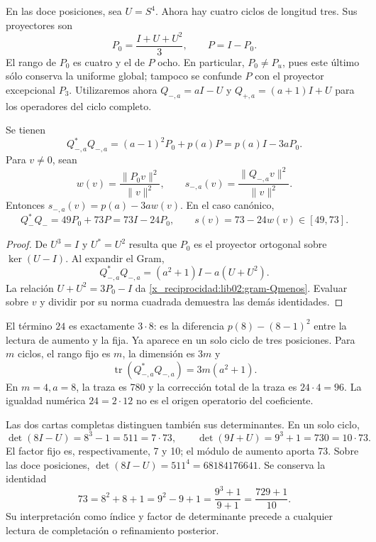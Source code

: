 En las doce posiciones, sea \(U=S^4\). Ahora hay cuatro ciclos de
longitud tres. Sus proyectores son
\[
 P_0=\frac{I+U+U^2}{3},\qquad P=I-P_0.
\]
El rango de \(P_0\) es cuatro y el de \(P\) ocho. En particular,
\(P_0\ne P_u\), pues este último sólo conserva la uniforme global;
tampoco se confunde \(P\) con el proyector excepcional \(P_3\).
Utilizaremos ahora \(Q_{-,a}=aI-U\) y \(Q_{+,a}=(a+1)I+U\)
para los operadores del ciclo completo.

\begin{theorem}
\label{x_reciprocidad:lib02:gram-ternario}
Se tienen
\begin{equation}
 Q_{-,a}^*Q_{-,a}
 =(a-1)^2P_0+p(a)P=p(a)I-3aP_0.
 \label{x_reciprocidad:lib02:gram-Qmenos}
\end{equation}
Para \(v\ne0\), sean
\[
 w(v)=\frac{\|P_0v\|^2}{\|v\|^2},\qquad
 s_{-,a}(v)=\frac{\|Q_{-,a}v\|^2}{\|v\|^2}.
\]
Entonces \(s_{-,a}(v)=p(a)-3aw(v)\). En el caso canónico,
\begin{equation}
 Q_-^*Q_-=49P_0+73P=73I-24P_0,
 \qquad s(v)=73-24w(v)\in[49,73].
 \label{x_reciprocidad:lib02:73-24w}
\end{equation}
\end{theorem}
\begin{proof}
De \(U^3=I\) y \(U^*=U^2\) resulta que \(P_0\) es el
proyector ortogonal sobre \(\ker(U-I)\). Al expandir el Gram,
\[
 Q_{-,a}^*Q_{-,a}=(a^2+1)I-a(U+U^2).
\]
La relación \(U+U^2=3P_0-I\) da
\eqref{x_reciprocidad:lib02:gram-Qmenos}. Evaluar sobre \(v\) y dividir por su
norma cuadrada demuestra las demás identidades.
\end{proof}

El término \(24\) es exactamente \(3\cdot8\): es la diferencia
\(p(8)-(8-1)^2\) entre la lectura de aumento y la fija. Ya aparece
en un solo ciclo de tres posiciones. Para \(m\) ciclos, el rango fijo
es \(m\), la dimensión es \(3m\) y
\[
 \operatorname{tr}(Q_{-,a}^*Q_{-,a})=3m(a^2+1).
\]
En \(m=4,a=8\), la traza es 780 y la corrección total de la traza
es \(24\cdot4=96\). La igualdad numérica \(24=2\cdot12\) no es
el origen operatorio del coeficiente.

Las dos cartas completas distinguen también sus determinantes. En un
solo ciclo,
\[
 \det(8I-U)=8^3-1=511=7\cdot73,
 \qquad
 \det(9I+U)=9^3+1=730=10\cdot73.
\]
El factor fijo es, respectivamente, 7 y 10; el módulo de aumento aporta
73. Sobre las doce posiciones,
\(\det(8I-U)=511^4=68184176641\). Se conserva la identidad
\begin{equation}
 73=8^2+8+1=9^2-9+1=\frac{9^3+1}{9+1}
 =\frac{729+1}{10}.
 \label{x_reciprocidad:lib02:completacion73}
\end{equation}
Su interpretación como índice y factor de determinante precede a
cualquier lectura de completación o refinamiento posterior.

